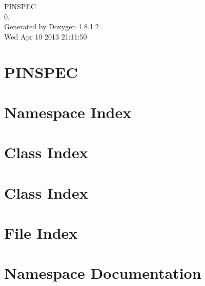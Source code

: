 \documentclass{book}
\begin{document}
\hypersetup{pageanchor=false,citecolor=blue}
\begin{titlepage}
\vspace*{7cm}
\begin{center}
{\Large P\-I\-N\-S\-P\-E\-C \\[1ex]\large 0. }\\
\vspace*{1cm}
{\large Generated by Doxygen 1.8.1.2}\\
\vspace*{0.5cm}
{\small Wed Apr 10 2013 21:11:50}\\
\end{center}
\end{titlepage}
\clearemptydoublepage
{}
\tableofcontents
\clearemptydoublepage
{}
\hypersetup{pageanchor=true,citecolor=blue}
\chapter{P\-I\-N\-S\-P\-E\-C}
\label{md_README}
\hypertarget{md_README}{}

\chapter{Namespace Index}

\chapter{Class Index}

\chapter{Class Index}

\chapter{File Index}

\chapter{Namespace Documentation}




\end{document}
